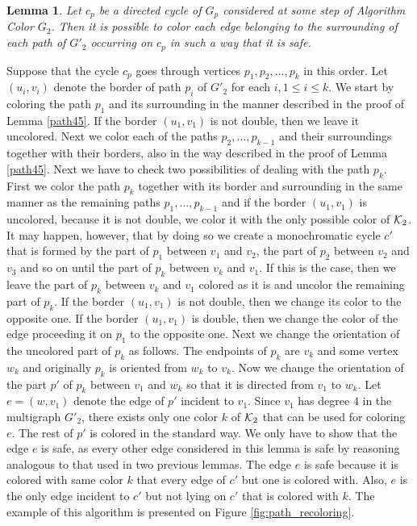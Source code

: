 \documentclass[a4, 11pt]{article}
\newcommand{\dowod}{\noindent{\bf Proof.~}}
\newcommand{\<}{\langle}
\renewcommand{\>}{\rangle}
\newcommand{\Kd}{{\cal K}_2}
\newtheorem{lemma}{Lemma}
\begin{document}
\begin{lemma}
\label{lemma:coloring_cycle_of_paths}
Let $c_p$ be a directed cycle of $G_p$ considered at some step of Algorithm Color $G_2$. Then it is possible to color each edge belonging to the surrounding of each path of $G'_2$ occurring on $c_p$ in such a way that it is safe.
\end{lemma}
\dowod
Suppose that the cycle $c_p$ goes through vertices $p_1, p_2, \ldots, p_k$ in this order. Let $(u_i, v_i)$ denote the border of path $p_i$ of $G'_2$ for each $i, 1 \leq i \leq k$.  We start by coloring the path $p_1$ and its surrounding in the manner described in the proof of Lemma \ref{path45}. If the border $(u_1, v_1)$ is not double, then we leave it uncolored. Next we color each of the paths $p_2, \ldots, p_{k-1}$ and their surroundings together with their borders, also in the way described in the proof of Lemma \ref{path45}. Next we have to check two possibilities of dealing with the path $p_k$. First we  color the path $p_k$ together with  its border and surrounding in the same manner
as the remaining paths $p_1, \ldots, p_{k-1}$ and if the border $(u_1, v_1)$ is uncolored, because it is not double, we color it with the only possible color of $\Kd$. It may happen, however, that by doing so we create a monochromatic cycle $c'$ that is formed by the part of $p_1$ between 
$v_1$ and $v_2$, the part of $p_2$ between $v_2$ and $v_3$ and so on until the part of $p_k$ between $v_k$ and $v_1$. If this is the case, then we leave the part of $p_k$ between $v_k$ and $v_1$ colored as it is and uncolor the remaining part of  $p_k$. If the border $(u_1, v_1)$
is not double, then we change its color to the opposite one. If the border $(u_1, v_1)$ is double, then we change the color of the edge proceeding it on $p_1$ to the opposite one. Next we change the orientation of the uncolored part of $p_k$ as follows. The endpoints of $p_k$ are $v_k$ and some vertex $w_k$ and originally $p_k$ is oriented from $w_k$ to $v_k$. Now we change the orientation of the part $p'$ of $p_k$ between $v_1$ and $w_k$ so that it is directed from $v_1$ to $w_k$.  Let $e=(w, v_1)$ denote the edge of $p'$ incident to $v_1$.  Since $v_1$ has degree $4$ in the multigraph $G'_2$, there exists only one color $k$ of $\Kd$ that can be used for coloring $e$. The rest of $p'$ is colored in the standard way. We only have to show that the edge $e$ is safe, as every other edge considered in this lemma is safe by reasoning analogous to that used in two previous lemmas. The edge $e$ is safe because it is colored with same color $k$ that every edge of $c'$ but one is colored with. Also, $e$ is the only edge incident to $c'$ but not lying on $c'$ that is colored with $k$. The example of this algorithm is presented on Figure \ref{fig:path_recoloring}.
\end{document}
